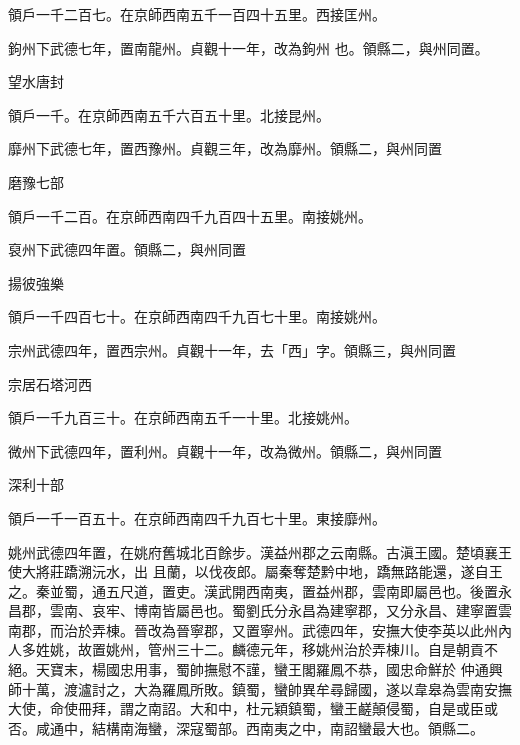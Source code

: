 \begin{pinyinscope}
 領戶一千二百七。在京師西南五千一百四十五里。西接匡州。



 鉤州下武德七年，置南龍州。貞觀十一年，改為鉤州
 也。領縣二，與州同置。



 望水唐封



 領戶一千。在京師西南五千六百五十里。北接昆州。



 靡州下武德七年，置西豫州。貞觀三年，改為靡州。領縣二，與州同置



 磨豫七部



 領戶一千二百。在京師西南四千九百四十五里。南接姚州。



 裒州下武德四年置。領縣二，與州同置



 揚彼強樂



 領戶一千四百七十。在京師西南四千九百七十里。南接姚州。



 宗州武德四年，置西宗州。貞觀十一年，去「西」字。領縣三，與州同置



 宗居石塔河西



 領戶一千九百三十。在京師西南五千一十里。北接姚州。



 微州下武德四年，置利州。貞觀十一年，改為微州。領縣二，與州同置



 深利十部



 領戶一千一百五十。在京師西南四千九百七十里。東接靡州。



 姚州武德四年置，在姚府舊城北百餘步。漢益州郡之云南縣。古滇王國。楚頃襄王使大將莊蹻溯沅水，出
 且蘭，以伐夜郎。屬秦奪楚黔中地，蹻無路能還，遂自王之。秦並蜀，通五尺道，置吏。漢武開西南夷，置益州郡，雲南即屬邑也。後置永昌郡，雲南、哀牢、博南皆屬邑也。蜀劉氏分永昌為建寧郡，又分永昌、建寧置雲南郡，而治於弄棟。晉改為晉寧郡，又置寧州。武德四年，安撫大使李英以此州內人多姓姚，故置姚州，管州三十二。麟德元年，移姚州治於弄棟川。自是朝貢不絕。天寶末，楊國忠用事，蜀帥撫慰不謹，蠻王閣羅鳳不恭，國忠命鮮於
 仲通興師十萬，渡瀘討之，大為羅鳳所敗。鎮蜀，蠻帥異牟尋歸國，遂以韋皋為雲南安撫大使，命使冊拜，謂之南詔。大和中，杜元穎鎮蜀，蠻王鹺顛侵蜀，自是或臣或否。咸通中，結構南海蠻，深寇蜀部。西南夷之中，南詔蠻最大也。領縣二。




\end{pinyinscope}
